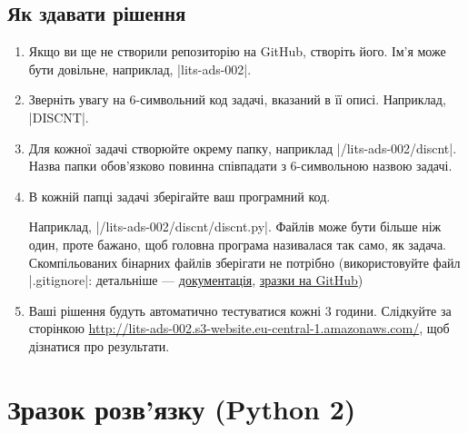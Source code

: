 \documentclass[12pt,a4paper]{article}
\begin{document}
\subsection*{Як здавати рішення}

\begin{enumerate}
    \item Якщо ви ще не створили репозиторію на GitHub, створіть його. Ім’я може бути довільне, наприклад, |lits-ads-002|.
    \item Зверніть увагу на 6-символьний код задачі, вказаний в її описі. Наприклад, |DISCNT|.
    \item Для кожної задачі створюйте окрему папку, наприклад |/lits-ads-002/discnt|. Назва папки обов’язково повинна співпадати з 6-символьною назвою задачі.
    \item В кожній папці задачі зберігайте ваш програмний код.

    Наприклад, |/lits-ads-002/discnt/discnt.py|. Файлів може бути більше ніж один, проте бажано, щоб головна програма називалася так само, як задача. Скомпільованих бінарних файлів зберігати не потрібно (використовуйте файл |.gitignore|: детальніше --- \href{http://git-scm.com/docs/gitignore}{документація}, \href{https://github.com/github/gitignore}{зразки на GitHub})

    \item Ваші рішення будуть автоматично тестуватися кожні 3 години. Слідкуйте за сторінкою \href{http://lits-ads-002.s3-website.eu-central-1.amazonaws.com/}{http://lits-ads-002.s3-website.eu-central-1.amazonaws.com/}, щоб дізнатися про результати.
\end{enumerate}


\pagebreak





\pagebreak


\section*{Зразок розв’язку (Python 2)}



\end{document}
